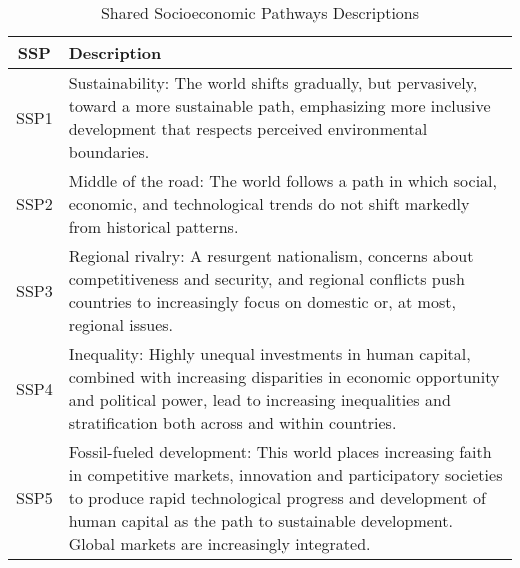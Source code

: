 \documentclass[honours,12pt]{unswthesis}
\numberwithin{equation}{section}
\begin{document}
\begin{table}[h]
    \centering
    \begin{tabularx}{\textwidth}{|c|X|}
        \hline
        \textbf{SSP} & \textbf{Description}                                                                                                                                                                                                                                                                      \\ \hline
        SSP1         & Sustainability: The world shifts gradually, but pervasively, toward a more sustainable path, emphasizing more inclusive development that respects perceived environmental boundaries.                                                                                                     \\ \hline
        SSP2         & Middle of the road: The world follows a path in which social, economic, and technological trends do not shift markedly from historical patterns.                                                                                                                                          \\ \hline
        SSP3         & Regional rivalry: A resurgent nationalism, concerns about competitiveness and security, and regional conflicts push countries to increasingly focus on domestic or, at most, regional issues.                                                                                             \\ \hline
        SSP4         & Inequality: Highly unequal investments in human capital, combined with increasing disparities in economic opportunity and political power, lead to increasing inequalities and stratification both across and within countries.                                                           \\ \hline
        SSP5         & Fossil-fueled development: This world places increasing faith in competitive markets, innovation and participatory societies to produce rapid technological progress and development of human capital as the path to sustainable development. Global markets are increasingly integrated. \\ \hline    
    \end{tabularx}
    \vspace{1pt}
    \caption{Shared Socioeconomic Pathways Descriptions}
    \label{table:ssp}
\end{table}
\end{document}
